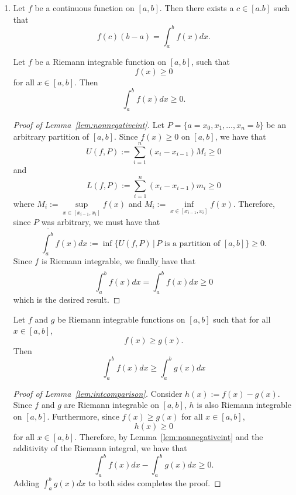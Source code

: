 \documentclass[12pt]{article}
\begin{document}
\begin{enumerate}[leftmargin=2em]
\begin{enumerate}[leftmargin=!]
        \item 
        \begin{theorem}[Integral Mean Value Theorem for $g(x)=1$]\label{thm:intMVT} Let $f$ be a continuous function on $[a,b]$. Then there exists a $c\in [a.b]$ such that
            \[f(c)(b-a)=\int_{a}^{b}f(x)dx.\]
        \end{theorem}
        \begin{lemma}\label{lem:nonnegativeint}
            Let $f$ be a Riemann integrable function on $[a,b]$, such that 
            \[f(x)\geq 0\]
            for all $x\in [a,b]$. Then
            \[\int_{a}^{b}f(x)dx \geq 0.\]
        \end{lemma}
        \begin{proof}[Proof of Lemma~\ref{lem:nonnegativeint}]
            Let $P=\{a=x_0,x_1,\ldots,x_n=b\}$ be an arbitrary  partition of $[a,b]$. Since $f(x)\geq 0$ on $[a,b]$, we have that
            \[U(f,P) := \sum_{i=1}^{n} (x_i-x_{i-1})M_i \geq 0\]
            and
            \[L(f,P):= \sum_{i=1}^{n} (x_i-x_{i-1})m_i \geq 0\]
            where $M_i:= \sup\limits_{x\in [x_{i-1},x_i]} f(x)$ and $M_i:= \inf\limits_{x\in [x_{i-1},x_i]} f(x)$. Therefore, since $P$ was arbitrary, we must have that
            \[\overline{\int_{a}^{b}} f(x)dx := \inf\{U(f,P)\, |\, P \text{ is a partition of } [a,b]\} \geq 0.\]
            Since $f$ is Riemann integrable, we finally have that
            \[\int_{a}^{b} f(x)dx = \overline{\int_{a}^{b}} f(x)dx\geq 0\]
            which is the desired result.
        \end{proof}
        \begin{lemma}\label{lem:intcomparison}
            Let $f$ and $g$ be Riemann integrable functions on $[a,b]$ such that for all $x\in [a,b]$,
            \[f(x)\geq g(x).\]
            Then
            \[\int_{a}^{b} f(x)dx\geq \int_{a}^{b} g(x)dx\]
        \end{lemma}
        \begin{proof}[Proof of Lemma~\ref{lem:intcomparison}]
            Consider $h(x):= f(x)-g(x)$. Since $f$ and $g$ are Riemann integrable on $[a,b]$, $h$ is also Riemann integrable on $[a,b]$. Furthermore, since 
            $f(x)\geq g(x)$ for all $x\in [a,b]$,
            \[h(x)\geq 0\]
            for all $x\in [a,b]$. Therefore, by Lemma~\ref{lem:nonnegativeint} and the additivity of the Riemann integral, we have that
            \[\int_{a}^{b}f(x)dx - \int_{a}^{b} g(x)dx \geq 0.\]
            Adding $\int_{a}^{b}g(x)dx$ to both sides completes the proof.
        \end{proof}

\end{enumerate}
\end{enumerate}
\end{document}
